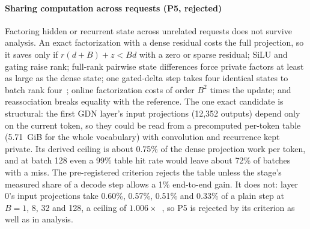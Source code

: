 \paragraph{Sharing computation across requests (P5, rejected)} Factoring hidden or recurrent state across unrelated requests does not survive analysis. An exact factorization with a dense residual costs the full projection, so it saves only if $r(d+B)+z<Bd$ with a zero or sparse residual; SiLU and gating raise rank; full-rank pairwise state differences force private factors at least as large as the dense state; one gated-delta step takes four identical states to batch rank four~; online factorization costs of order $B^2$ times the update; and reassociation breaks equality with the reference. The one exact candidate is structural: the first GDN layer's input projections (12,352 outputs) depend only on the current token, so they could be read from a precomputed per-token table (5.71~GiB for the whole vocabulary) with convolution and recurrence kept private. Its derived ceiling is about 0.75\% of the dense projection work per token, and at batch 128 even a 99\% table hit rate would leave about 72\% of batches with a miss. The pre-registered criterion rejects the table unless the stage's measured share of a decode step allows a 1\% end-to-end gain. It does not: layer 0's input projections take 0.60\%, 0.57\%, 0.51\% and 0.33\% of a plain step at $B=1$, 8, 32 and 128, a ceiling of $1.006\times$~, so P5 is rejected by its criterion as well as in analysis.

